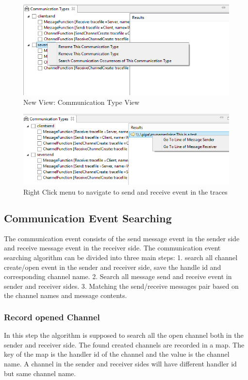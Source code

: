 \documentclass[paper=a4, fontsize=11pt]{scrartcl}
\numberwithin{equation}{section}		%
\numberwithin{figure}{section}			%
\numberwithin{table}{section}				%
\begin{document}
\begin{figure}[h]
\includegraphics[scale=.9]{CommunicationTypeview}
 \caption{New View: Communication Type View}
\label{CommunicationTypeview}
\end{figure}

\begin{figure}[h]
\includegraphics[scale=.9]{searchresult}
 \caption{Right Click menu to navigate to send and receive event in the traces}
\label{searchresult}
\end{figure}

\subsection{Communication Event Searching}
The communication event consists of the send message event in the sender side and receive message event in the receiver side. The communication event searching algorithm can be divided into three main steps: 1. search all channel create/open event in the sender and receiver side, save the handle id and corresponding channel name. 2. Search all message send and receive event in sender and receiver sides. 3. Matching the send/receive messages pair based on the channel names and message contents.
\subsubsection{Record opened Channel}
In this step the algorithm is supposed to search all the open channel both in the sender and receiver side. The found created channels are recorded in a map. The key of the map is the handler id of the channel and the value is the channel name. A channel in the sender and receiver sides will have different handler id but same channel name.
\end{document}
